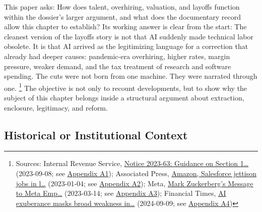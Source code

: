 \documentclass[
  american,
  11pt,
  letterpaper,
]{article}
\begin{document}
This paper asks: How does talent, overhiring, valuation, and layoffs
function within the dossier's larger argument, and what does the
documentary record allow this chapter to establish? Its working answer
is clear from the start: The cleanest version of the layoffs story is
not that AI suddenly made technical labor obsolete. It is that AI
arrived as the legitimizing language for a correction that already had
deeper causes: pandemic-era overhiring, higher rates, margin pressure,
weaker demand, and the tax treatment of research and software spending.
The cuts were not born from one machine. They were narrated through one.
\footnote{Sources: Internal Revenue Service,
  \href{https://www.irs.gov/pub/irs-drop/n-23-63.pdf}{Notice 2023-63:
  Guidance on Section 1\ldots{}} (2023-09-08; see
  \hyperref[appendix-a1-notice-2023-63-guidance-on-section-174-and-specified-research-or-experimental-expenditures]{Appendix
  A1}); Associated Press,
  \href{https://apnews.com/article/bbb2f3a09eafdfc7cda54a3b87e538ad}{Amazon,
  Salesforce jettison jobs in l\ldots{}} (2023-01-04; see
  \hyperref[appendix-a2-amazon-salesforce-jettison-jobs-in-latest-tech-worker-purge]{Appendix
  A2}); Meta,
  \href{https://about.fb.com/news/2023/03/mark-zuckerberg-meta-year-of-efficiency/}{Mark
  Zuckerberg's Message to Meta Emp\ldots{}} (2023-03-14; see
  \hyperref[appendix-a3-mark-zuckerberg-s-message-to-meta-employees]{Appendix
  A3}); Financial Times,
  \href{https://www.ft.com/content/0b14d871-2d19-46f1-9660-5466301e8066}{AI
  exuberance masks broad weakness in\ldots{}} (2024-09-09; see
  \hyperref[appendix-a4-ai-exuberance-masks-broad-weakness-in-tech-sector-say-investors]{Appendix
  A4})} The objective is not only to recount developments, but to show
why the subject of this chapter belongs inside a structural argument
about extraction, enclosure, legitimacy, and reform.

\subsection{Historical or Institutional
Context}\label{historical-or-institutional-context}
\end{document}
